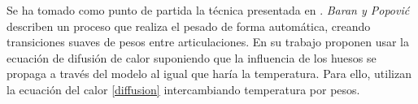 %


Se ha tomado como punto de partida la técnica presentada en \cite{Baran:2007}. \emph{Baran y Popovi\'{c}} describen un proceso que realiza el pesado de forma automática, creando transiciones suaves de pesos entre articulaciones. En su trabajo proponen usar la ecuación de difusión de calor suponiendo que la influencia de los huesos se propaga a través del modelo al igual que haría la temperatura. Para ello, utilizan la ecuación del calor \ref{diffusion} intercambiando temperatura por pesos.  




